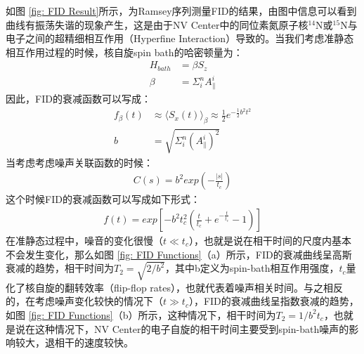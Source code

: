 \documentclass[type = bachelor, oneside]{whu-thesis}
\begin{document}
如图 \ref{fig: FID Result}所示，为Ramsey序列测量FID的结果，由图中信息可以看到曲线有振荡失谐的现象产生，这是由于NV Center中的同位素氮原子核$^{14}$N或$^{15}$N与电子之间的超精细相互作用（Hyperfine Interaction）导致的。当我们考虑准静态相互作用过程的时候，核自旋spin bath的哈密顿量为：
\begin{equation}
  \begin{aligned}
    H_{bath} &= \beta S_z \\
    \beta &= \Sigma^n_iA_{\parallel}^i
  \end{aligned}
\end{equation}
因此，FID的衰减函数可以写成：
\begin{equation}
  \begin{aligned}
    f_{\beta}(t) &\approx \langle S_x(t) \rangle_{\beta} \approx \frac{1}{2}e^{-\frac{1}{2}b^2t^2} \\
    b &= \sqrt{\Sigma_i^n(A_{\parallel}^i)^2}
  \end{aligned}
\end{equation}
当考虑考虑噪声关联函数的时候：
\begin{equation}
  \begin{aligned}
    C(s)=b^2exp(-\frac{|s|}{t_c})
  \end{aligned}
\end{equation}
这个时候FID的衰减函数可以写成如下形式：
\begin{equation}
  \begin{aligned}
    f(t)=exp[-b^2t_c^2(\frac{t}{t_c}+e^{-\frac{t}{t_c}}-1)]
  \end{aligned}
\end{equation}
在准静态过程中，噪音的变化很慢（$t\ll t_c$），也就是说在相干时间的尺度内基本不会发生变化，那么如图 \ref{fig: FID Functions}（a）所示，FID的衰减曲线呈高斯衰减的趋势，相干时间为$T_2 = \sqrt{2/b^2}$，其中b定义为spin-bath相互作用强度，$t_c$量化了核自旋的翻转效率（flip-flop rates），也就代表着噪声相关时间。与之相反的，在考虑噪声变化较快的情况下（$t\gg t_c$），FID的衰减曲线呈指数衰减的趋势，如图 \ref{fig: FID Functions}（b）所示，这种情况下，相干时间为$T_2 = 1/b^2t_c$，也就是说在这种情况下，NV Center的电子自旋的相干时间主要受到spin-bath噪声的影响较大，退相干的速度较快。
\end{document}
